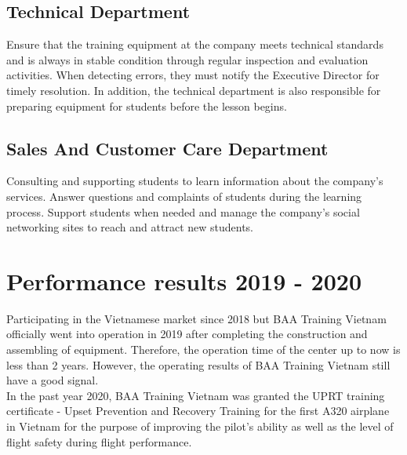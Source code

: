     \subsection{Technical Department}
        Ensure that the training equipment at the company meets technical standards and is always in stable condition through regular inspection and 
        evaluation activities. When detecting errors, they must notify the Executive Director for timely resolution. In addition, the technical department 
        is also responsible for preparing equipment for students before the lesson begins.
    \subsection{Sales And Customer Care Department}
        Consulting and supporting students to learn information about the company's services. Answer questions and complaints of students during the learning 
        process. Support students when needed and manage the company's social networking sites to reach and attract new students.

\section{Performance results 2019 - 2020}
    Participating in the Vietnamese market since 2018 but BAA Training Vietnam officially went into operation in 2019 after completing the construction 
    and assembling of equipment. Therefore, the operation time of the center up to now is less than 2 years. However, the operating results of BAA 
    Training Vietnam still have a good signal. \\ 
    \vspace{3mm}
    In the past year 2020, BAA Training Vietnam was granted the UPRT training certificate - Upset Prevention and Recovery Training for the first A320 
    airplane in Vietnam for the purpose of improving the pilot's ability as well as the level of flight safety during flight performance.